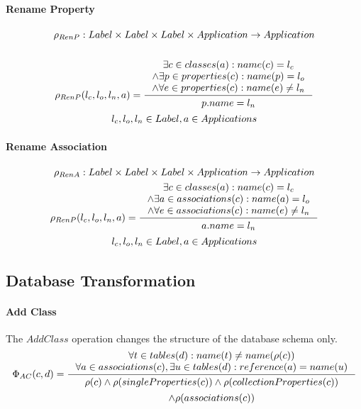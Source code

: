 \documentclass[11pt]{article}
\begin{document}
\paragraph{Rename Property}
\begin{gather*}
\rho_{RenP} : Label \times Label \times Label \times Application \rightarrow Application \\ \\
	\rho_{RenP}(l_c, l_o, l_n, a) = \inference{\exists c \in classes(a) : name(c) = l_c \\ \wedge \exists p \in properties(c) : name(p) = l_o \\ \wedge \forall e \in properties(c) : name(e) \neq l_n}{\begin{gathered}
p.name = l_n 
\end{gathered}}\\
l_c, l_o, l_n \in Label, a \in Applications
\end{gather*}

\paragraph{Rename Association}
\begin{gather*}
\rho_{RenA} : Label \times Label \times Label \times Application \rightarrow Application \\
	\rho_{RenP}(l_c, l_o, l_n, a) = \inference{\exists c \in classes(a) : name(c) = l_c \\ \wedge \exists a \in associations(c) : name(a) = l_o \\ \wedge \forall e \in associations(c) : name(e) \neq l_n}{\begin{gathered}
a.name = l_n 
\end{gathered}}\\
l_c, l_o, l_n \in Label, a \in Applications
\end{gather*}


\subsection{Database Transformation}
\paragraph{Add Class} The $AddClass$ operation changes the structure of the database schema only.
$$
\Phi_{AC}(c, d) = \inference{ \forall t \in tables(d) : name(t) \neq name(\rho(c)) \\
	\forall a \in associations(c), \exists u \in  tables(d) : reference(a) = name(u) 
}{
\begin{gathered}
  \rho(c) \wedge \rho(singleProperties(c)) \wedge \rho(collectionProperties(c)) \\ \wedge \rho(associations(c))
\end{gathered}
}
$$
\end{document}
